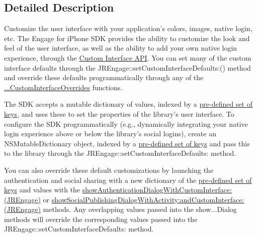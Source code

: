 \subsection{Detailed Description}
Customize the user interface with your application's colors, images, native login, etc. The Engage for iPhone SDK provides the ability to customize the look and feel of the user interface, as well as the ability to add your own native login experience, through the \hyperlink{group__custom_interface}{Custom Interface API}. You can set many of the custom interface defaults through the JREngage::setCustomInterfaceDefaults:() method and override these defaults programmatically through any of the \hyperlink{class_j_r_engage_showMethods}{...CustomInterfaceOverrides} functions.

The SDK accepts a mutable dictionary of values, indexed by a \hyperlink{group__custom_interface_customInterfaceKeys}{pre-\/defined set of keys}, and uses these to set the properties of the library's user interface. To configure the SDK programmatically (e.g., dynamically integrating your native login experience above or below the library's social logins), create an NSMutableDictionary object, indexed by a \hyperlink{group__custom_interface_customInterfaceKeys}{pre-\/defined set of keys} and pass this to the library through the JREngage::setCustomInterfaceDefaults: method.

You can also override these default customizations by launching the authentication and social sharing with a new dictionary of the \hyperlink{group__custom_interface_customInterfaceKeys}{pre-\/defined set of keys} and values with the \hyperlink{class_j_r_engage_ac8e1206be8608fbed548b7ec5f85e6e6}{showAuthenticationDialogWithCustomInterface: (JREngage)} or \hyperlink{class_j_r_engage_af5c2aa40f5c45a22f369900d1bd81953}{showSocialPublishingDialogWithActivity:andCustomInterface: (JREngage)} methods. Any overlapping values passed into the {\ttfamily show}...Dialog methods will override the corresponding values passed into the JREngage::setCustomInterfaceDefaults: method. 

